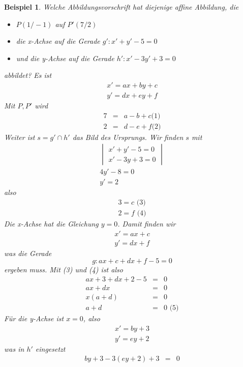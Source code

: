 \documentclass[a4paper,10pt]{report}
\newtheorem{myexample}{Beispiel}
\begin{document}
\begin{myexample}
Welche Abbildungsvorschrift hat diejenige affine Abbildung, die 
\begin{itemize}
	\item $P(1/-1)$ auf $P'(7/2)$
	\item die x-Achse auf die Gerade $g' : x'+y'-5 = 0$
	\item und die y-Achse auf die Gerade $h' : x' - 3y' + 3 = 0$
\end{itemize}
abbildet?
Es ist
\begin{eqnarray*}
x'=ax+by+c\\
y'=dx+ey+f
\end{eqnarray*}
Mit $P, P'$ wird
\begin{eqnarray*}
7 &=& a-b+c \textit{(1)}\\
2 &=& d-e+f \textit{(2)}
\end{eqnarray*}
Weiter ist $s=g'\cap h'$ das Bild des Ursprungs. Wir finden $s$ mit 
\begin{eqnarray*}
\begin{vmatrix}x' + y'-5 = 0\\x'-3y + 3 = 0\end{vmatrix}\\
4y'-8 = 0\\
y' = 2
\end{eqnarray*}
also
\begin{eqnarray*}
3=c \textit{ (3)}\\
2=f \textit{ (4)}
\end{eqnarray*}
Die x-Achse hat die Gleichung $y=0$. Damit finden wir
\begin{eqnarray*}
x'=ax+c\\
y'=dx+f
\end{eqnarray*}
was die Gerade 
\begin{equation*}g: ax+c+dx+f-5 = 0\end{equation*}
ergeben muss. Mit (3) und (4) ist also
\begin{eqnarray*}
ax+3+dx+2-5 &=& 0\\
ax+dx&=& 0\\
x(a+d) &=& 0\\
a+d&=& 0 \textit{ (5)}
\end{eqnarray*}
Für die y-Achse ist $x=0$, also
\begin{eqnarray*}
x'=by +3\\
y'=ey+2
\end{eqnarray*}
was in $h'$ eingesetzt
\begin{eqnarray*}
by+3-3(ey+2) + 3 &=& 0\\

\end{eqnarray*}
\end{myexample}
\end{document}
